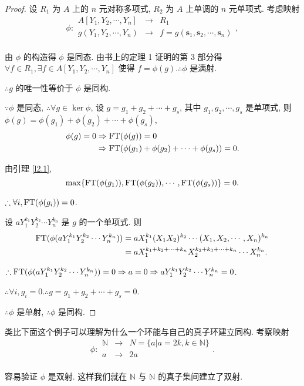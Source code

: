 \documentclass[UTF8]{ctexart}
\begin{document}
\begin{proof}
    设 $R_1$ 为 $A$ 上的 $n$ 元对称多项式, $R_2$ 为 $A$ 上单调的 $n$ 元单项式. 考虑映射
    \[\phi:\begin{array}{rcl}
        A[Y_1,Y_2,\cdots,Y_n] & \to & R_1 \\
        g(Y_1,Y_2,\cdots,Y_n) & \to & f=g(\mathbf{s}_1,\mathbf{s}_2,\cdots,\mathbf{s}_n) \\
    \end{array},\]

    由 $\phi$ 的构造得 $\phi$ 是同态. 由书上的定理 1 证明的第 3 部分得 $\forall f\in R_1,\exists f\in A[Y_1,Y_2,\cdots,Y_n]$ 使得 $f=\phi(g).\therefore\phi$ 是满射.
    
    $\therefore g$ 的唯一性等价于 $\phi$ 是同构.
    
    $\because\phi$ 是同态, $\therefore\forall g\in\ker\phi$, 设 $g=g_1+g_2+\cdots+g_s$, 其中 $g_1,g_2,\cdots,g_s$ 是单项式, 则 $\phi(g)=\phi(g_1)+\phi(g_2)+\cdots+\phi(g_s)$,
    \begin{align*}
        \phi(g)=0 & \Rightarrow\operatorname{FT} (\phi(g))=0 \\
        & \Rightarrow\operatorname{FT} (\phi(g_1)+\phi(g_2)+\cdots+\phi(g_s))=0.
    \end{align*}

    由引理 \ref{l2.1},
    \[\max\{\operatorname{FT} (\phi(g_1)),\operatorname{FT} (\phi(g_2)),\cdots,\operatorname{FT} (\phi(g_s))\}=0.\]

    $\therefore\forall i,\operatorname{FT} (\phi(g_i))=0$.

    设 $aY^{k_1}_1Y^{k_2}_2\cdots Y^{k_n}_n$ 是 $g$ 的一个单项式. 则
    \begin{align*}
        \operatorname{FT} (\phi(aY^{k_1}_1Y^{k_2}_2\cdots Y^{k_n}_n)) & =aX_1^{k_1}(X_1X_2)^{k_2}\cdots(X_1,X_2,\cdots,X_n)^{k_n} \\
        & =aX_1^{k_1+k_2+\cdots+k_n}X_2^{k_2+k_3+\cdots+k_n}\cdots X_n^{k_n}.
    \end{align*}

    $\therefore\operatorname{FT} (\phi(aY^{k_1}_1Y^{k_2}_2\cdots Y^{k_n}_n))=0\Rightarrow a=0\Rightarrow aY^{k_1}_1Y^{k_2}_2\cdots Y^{k_n}_n=0$.

    $\therefore\forall i,g_i=0.\therefore g=g_1+g_2+\cdots+g_s=0$.

    $\therefore\phi$ 是单射, $\therefore\phi$ 是同构.
\end{proof}
\begin{note}
    类比下面这个例子可以理解为什么一个环能与自己的真子环建立同构. 考察映射
    \[\phi:\begin{array}{rcl}
        \mathbb{N} & \to & N=\{a|a=2k,k\in\mathbb{N}\} \\
        a & \to & 2a \\
    \end{array}.\]

    容易验证 $\phi$ 是双射. 这样我们就在 $\mathbb{N}$ 与 $\mathbb{N}$ 的真子集间建立了双射.
\end{note}
\end{document}
